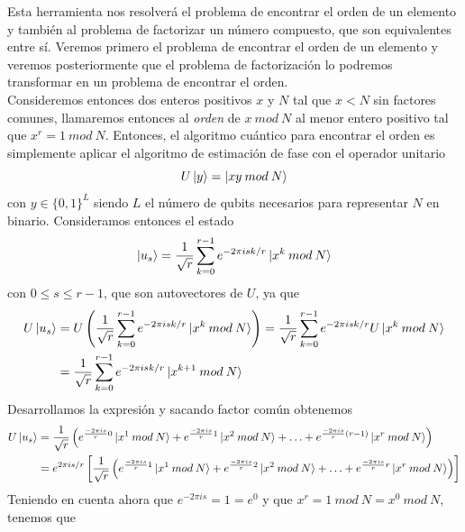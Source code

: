 \documentclass[a4paper]{article}
\numberwithin{equation}{section}
\newcommand{\modd}{\: mod \:}
\begin{document}
Esta herramienta nos resolverá el problema de encontrar el orden de un elemento y también al problema de factorizar un número compuesto, que son equivalentes entre sí. Veremos primero el problema de encontrar el orden de un elemento y veremos posteriormente que el problema de factorización lo podremos transformar en un problema de encontrar el orden.\\
\linebreak
Consideremos entonces dos enteros positivos $x$ y $N$ tal que $x<N$ sin factores comunes, llamaremos entonces al \textit{orden} de $x \modd N$ al menor entero positivo tal que $x^r =  1\modd N$. Entonces, el algoritmo cuántico para encontrar el orden es simplemente aplicar el algoritmo de estimación de fase con el operador unitario
\begin{equation}
U\ket{y} = \ket{x y \modd N}
\end{equation}
con $y \in \{0, 1\}^L$ siendo $L$ el número de qubits necesarios para representar $N$ en binario. Consideramos entonces el estado
\begin{equation}
\ket{u_s} =
\frac{1}{\sqrt{r}} \sum_{k=0}^{r-1} e^{-2\pi isk/r}\ket{x^k \modd N}
\end{equation}
con $0\leq s \leq r-1$, que son autovectores de $U$, ya que
\begin{equation}
\begin{split}
U\ket{u_s} &=
U\left( \frac{1}{\sqrt{r}} \sum_{k=0}^{r-1} e^{-2\pi isk/r}\ket{x^k \modd N} \right) =
\frac{1}{\sqrt{r}} \sum_{k=0}^{r-1} e^{-2\pi isk/r} U \ket{x^k \modd N}
\\ &=
\frac{1}{\sqrt{r}} \sum_{k=0}^{r-1} e^{-2\pi isk/r}\ket{x^{k+1} \modd N}
\end{split}
\end{equation}
Desarrollamos la expresión y sacando factor común obtenemos
\begin{equation}
\begin{split}
U\ket{u_s} &=
\frac{1}{\sqrt{r}} \left(
e^{\frac{-2\pi is}{r}0} \ket{x^1 \modd N} +
e^{\frac{-2\pi is}{r}1} \ket{x^2 \modd N} + \ldots +
e^{\frac{-2\pi is}{r}(r-1)} \ket{x^r \modd N} \right)
\\ &=
e^{2\pi is/r} \left[
\frac{1}{\sqrt{r}} \left(
e^{\frac{-2\pi is}{r}1} \ket{x^1 \modd N} +
e^{\frac{-2\pi is}{r}2} \ket{x^2 \modd N} + \ldots +
e^{\frac{-2\pi is}{r}r} \ket{x^r \modd N} \right) \right]
\end{split}
\end{equation}
Teniendo en cuenta ahora que $e^{-2\pi is} = 1 = e^0$ y que $x^r = 1 \modd N = x^0 \modd N$, tenemos que
\end{document}
